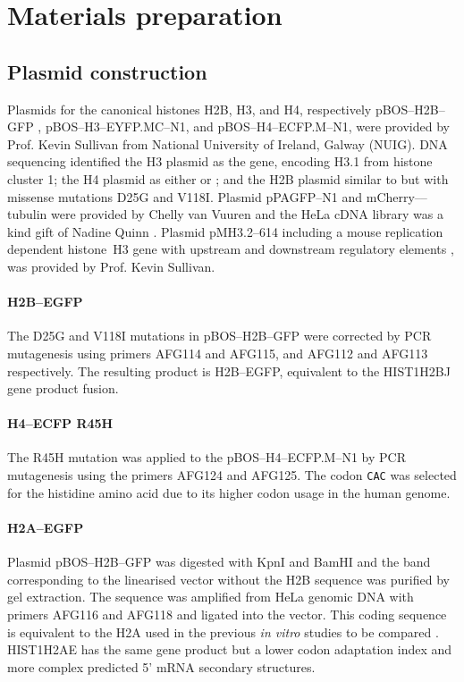 \section{Materials preparation}

  \subsection{Plasmid construction}
    Plasmids for the canonical histones H2B, H3, and H4,
    respectively pBOS--H2B--GFP \citep{KevinH2BGFP},
    pBOS--H3--EYFP.MC--N1, and pBOS--H4--ECFP.M--N1,
    were provided by Prof. Kevin Sullivan from National University of Ireland,
    Galway (NUIG). DNA sequencing identified the H3 plasmid as the  gene,
    encoding H3.1 from histone cluster 1; the H4 plasmid as either
     or ;
    and the H2B plasmid similar to  but with missense mutations D25G and V118I.
    Plasmid pPAGFP--N1 and mCherry--\textalpha--tubulin were provided by Chelly van Vuuren
    and the HeLa cDNA library was a kind gift of Nadine Quinn \citep{NadineThesis}.
    Plasmid pMH3.2--614 including a mouse replication dependent histone~H3
    gene with upstream and downstream regulatory elements \citep{pMH3-plasmid},
    was provided by Prof. Kevin Sullivan.

    \paragraph{H2B--EGFP}
      The D25G and V118I mutations in pBOS--H2B--GFP were corrected by PCR mutagenesis
      using primers AFG114 and AFG115, and AFG112 and AFG113 respectively.
      The resulting product is H2B--EGFP, equivalent to the HIST1H2BJ gene product fusion.

    \paragraph{H4--ECFP R45H}
      The R45H mutation was applied to the pBOS--H4--ECFP.M--N1 by
      PCR mutagenesis using the primers AFG124 and AFG125. The codon
      \texttt{CAC} was selected for the histidine amino acid due to its
      higher codon usage in the human genome\citep{codon_usage}.

    \paragraph{H2A--EGFP}
      Plasmid pBOS--H2B--GFP was digested with KpnI and BamHI
      and the band corresponding to the linearised vector without the H2B sequence
      was purified by gel extraction. The  sequence was amplified
      from HeLa genomic DNA with primers AFG116 and AFG118 and ligated into the vector.
      This coding sequence is equivalent to the H2A used in the previous
      \textit{in vitro} studies to be compared \citep{flaus2004sin}.
      HIST1H2AE has the same gene product but a lower codon adaptation index
      and more complex predicted 5' mRNA secondary structures.

